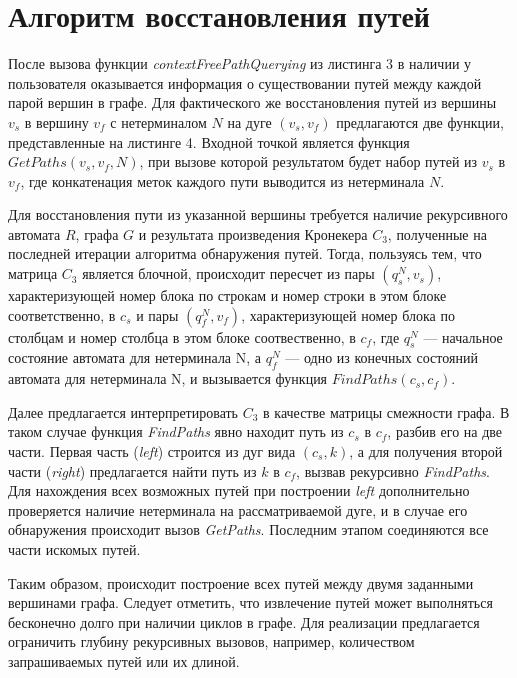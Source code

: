 \section{Алгоритм восстановления путей}

После вызова функции \textit{contextFreePathQuerying} из листинга 3 в наличии у пользователя оказывается информация о существовании путей между каждой парой вершин в графе. Для фактического же восстановления путей из вершины $v_s$ в вершину $v_f$ с нетерминалом $N$ на дуге $(v_s, v_f)$ предлагаются две функции, представленные на листинге 4. Входной точкой является функция $GetPaths(v_s, v_f, N)$, при вызове которой результатом будет набор путей из $v_s$ в $v_f$, где конкатенация меток каждого пути выводится из нетерминала $N$.

Для восстановления пути из указанной вершины требуется наличие рекурсивного автомата $R$, графа $G$ и результата произведения Кронекера $C_3$, полученные на последней итерации алгоритма обнаружения путей. Тогда, пользуясь тем, что матрица $C_3$ является блочной, происходит пересчет из пары $(q_s^N, v_s)$, характеризующей номер блока по строкам и номер строки в этом блоке соответственно, в $c_s$ и пары $(q_f^N, v_f)$, характеризующей номер блока по столбцам и номер столбца в этом блоке соотвественно, в $c_f$, где $q_s^N$ --- начальное состояние автомата для нетерминала N, а $q_f^N$ --- одно из конечных состояний автомата для нетерминала N, и вызывается функция $FindPaths(c_s, c_f)$. 

Далее предлагается интерпретировать $C_3$ в качестве матрицы смежности графа. В таком случае функция \textit{FindPaths} явно находит путь из $c_s$ в $c_f$, разбив его на две части. Первая часть (\textit{left}) строится из дуг вида $(c_s, k)$, а для получения второй части (\textit{right}) предлагается найти путь из $k$ в $c_f$, вызвав рекурсивно \textit{FindPaths}. Для нахождения всех возможных путей при построении \textit{left} дополнительно проверяется наличие нетерминала на рассматриваемой дуге, и в случае его обнаружения происходит вызов \textit{GetPaths}. Последним этапом соединяются все части искомых путей.

Таким образом, происходит построение всех путей между двумя заданными вершинами графа. Следует отметить, что извлечение путей может выполняться бесконечно долго при наличии циклов в графе. Для реализации предлагается ограничить глубину рекурсивных вызовов, например, количеством запрашиваемых путей или их длиной.

